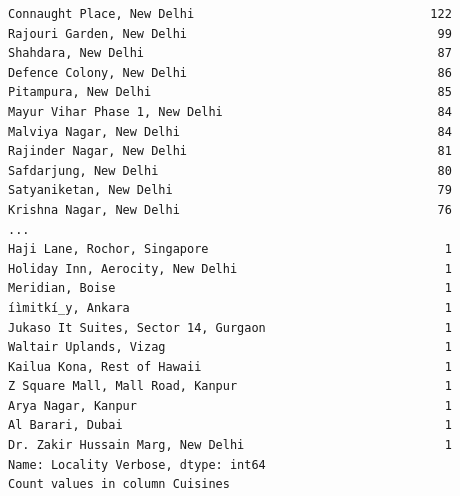 \documentclass[11pt]{article} %
\begin{document}
\begin{lstlisting}
Connaught Place, New Delhi                                 122
Rajouri Garden, New Delhi                                   99
Shahdara, New Delhi                                         87
Defence Colony, New Delhi                                   86
Pitampura, New Delhi                                        85
Mayur Vihar Phase 1, New Delhi                              84
Malviya Nagar, New Delhi                                    84
Rajinder Nagar, New Delhi                                   81
Safdarjung, New Delhi                                       80
Satyaniketan, New Delhi                                     79
Krishna Nagar, New Delhi                                    76
...
Haji Lane, Rochor, Singapore                                 1
Holiday Inn, Aerocity, New Delhi                             1
Meridian, Boise                                              1
íìmitkí_y, Ankara                                            1
Jukaso It Suites, Sector 14, Gurgaon                         1
Waltair Uplands, Vizag                                       1
Kailua Kona, Rest of Hawaii                                  1
Z Square Mall, Mall Road, Kanpur                             1
Arya Nagar, Kanpur                                           1
Al Barari, Dubai                                             1
Dr. Zakir Hussain Marg, New Delhi                            1
Name: Locality Verbose, dtype: int64
Count values in column Cuisines 


\end{lstlisting}
\end{document}
